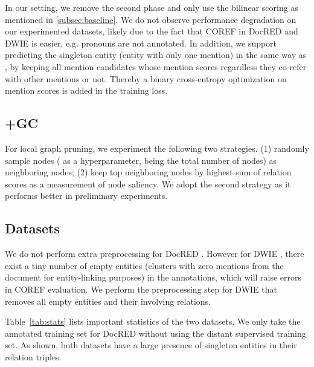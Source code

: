 \documentclass[11pt]{article}
\begin{document}
In our setting, we remove the second phase and only use the bilinear scoring as mentioned in \textsection\ref{subsec:baseline}. We do not observe performance degradation on our experimented datasets, likely due to the fact that COREF in DocRED and DWIE is easier, e.g. pronouns are not annotated. In addition, we support predicting the singleton entity (entity with only one mention) in the same way as \citet{crac}, by keeping all mention candidates whose mention scores  regardless they co-refer with other mentions or not. Thereby a binary cross-entropy optimization on mention scores is added in the training loss.

\subsection{+GC}
\label{appd:gc}

For local graph pruning, we experiment the following two strategies. (1) randomly sample  nodes ( as a hyperparameter,  being the total number of nodes) as neighboring nodes; (2) keep top  neighboring nodes by highest sum of relation scores as a measurement of node saliency. We adopt the second strategy as it performs better in preliminary experiments.

\subsection{Datasets}
\label{appd:datasets}

We do not perform extra preprocessing for DocRED \citep{docred}. However for DWIE \citep{dwie}, there exist a tiny number of empty entities (clusters with zero mentions from the document for entity-linking purposes) in the annotations, which will raise errors in COREF evaluation. We perform the preprocessing step for DWIE that removes all empty entities and their involving relations.

Table~\ref{tab:stats} lists important statistics of the two datasets. We only take the annotated training set for DocRED without using the distant supervised training set. As shown, both datasets have a large presence of singleton entities in their relation triples.

\begin{table}[tbp!]
\centering
{}
\caption{Statistics of the dataset DocRED and DWIE. TRN, DEV, TST are the numbers of documents in the training, development, and test set. \texttt{\#T} and \texttt{\#E} are the averaged numbers of tokens and entity clusters per document. \texttt{\%S} is the averaged percentage of singleton entities out of all entities per document.}
\label{tab:stats}
\end{table}
\end{document}
